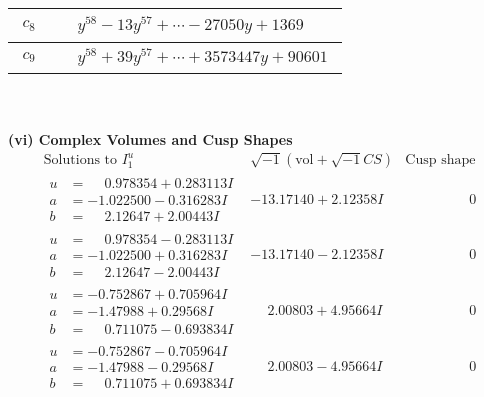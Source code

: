 \documentclass[1p]{elsarticle_modified}
\theoremstyle{definition}
\newcommand{\I}{\sqrt{-1}}
\begin{document}
\begin{tabular}{m{50pt}|m{274pt}}
\hline $$\begin{aligned}c_{8}\end{aligned}$$&$\begin{aligned}
&y^{58}-13 y^{57}+\cdots-27050 y+1369
\end{aligned}$\\
\hline $$\begin{aligned}c_{9}\end{aligned}$$&$\begin{aligned}
&y^{58}+39 y^{57}+\cdots+3573447 y+90601
\end{aligned}$\\
\hline
\end{tabular}\\~\\
\newpage\flushleft \textbf{(vi) Complex Volumes and Cusp Shapes}
$$\begin{array}{c|c|c}  
\text{Solutions to }I^u_{1}& \I (\text{vol} + \sqrt{-1}CS) & \text{Cusp shape}\\
 \hline 
\begin{aligned}
u &= \phantom{-}0.978354 + 0.283113 I \\
a &= -1.022500 - 0.316283 I \\
b &= \phantom{-}2.12647 + 2.00443 I\end{aligned}
 & -13.17140 + 2.12358 I & \phantom{-0.000000 } 0 \\ \hline\begin{aligned}
u &= \phantom{-}0.978354 - 0.283113 I \\
a &= -1.022500 + 0.316283 I \\
b &= \phantom{-}2.12647 - 2.00443 I\end{aligned}
 & -13.17140 - 2.12358 I & \phantom{-0.000000 } 0 \\ \hline\begin{aligned}
u &= -0.752867 + 0.705964 I \\
a &= -1.47988 + 0.29568 I \\
b &= \phantom{-}0.711075 - 0.693834 I\end{aligned}
 & \phantom{-}2.00803 + 4.95664 I & \phantom{-0.000000 } 0 \\ \hline\begin{aligned}
u &= -0.752867 - 0.705964 I \\
a &= -1.47988 - 0.29568 I \\
b &= \phantom{-}0.711075 + 0.693834 I\end{aligned}
 & \phantom{-}2.00803 - 4.95664 I & \phantom{-0.000000 } 0 \\ \hline\begin{aligned}

\end{aligned}
\end{array}$$
\end{document}
